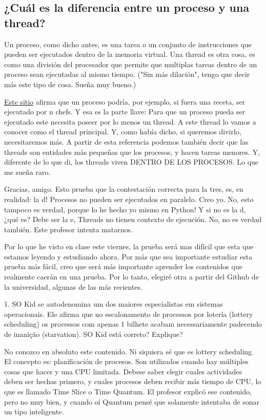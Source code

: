 \subsection{¿Cuál es la diferencia entre un proceso y una thread?}
Un proceso, como dicho antes, es una tarea o un conjunto de instrucciones que pueden ser ejecutados dentro de la memoria virtual.
Una thread es otra cosa, es como una división del procesador que permite que multiplas tareas dentro de un proceso sean ejecutadas al mismo tiempo.
("Sin más dilación", tengo que decir más este tipo de cosa. Sueña muy bueno.)

\href{https://codigofacilito.com/articulos/threads-procesos}{Este sitio} afirma que un
proceso podría, por ejemplo, si fuera una receta, ser ejecutado por n chefs. Y esa es la parte llave:
Para que un proceso pueda ser ejecutado este necesita poseer por lo menos un thread. 
A este thread lo vamos a conocer como el thread principal.
Y, como había dicho, si queremos divirlo, necesitaremos más. A partir de esta referencia podemos también decir que las threads
son entidades más pequeñas que los procesos, y hacen tareas menores. Y, diferente de lo que di, los threads
viven DENTRO DE LOS PROCESOS. Lo que me sueña raro.

Gracias, amigo. Esto prueba que la contestación correcta para la tres, es, en realidad:
la d! Procesos no pueden ser ejecutados en paralelo. Creo yo. No, esto tampoco es verdad, porque lo he hecho yo mismo en Python!
Y si no es la d, ¿qué es? Debe ser la e, Threads no tienen contexto de ejecución. No, no es verdad también.
Este profesor intenta matarnos.

Por lo que he visto en clase este viernes, la prueba será mas difícil que esta que estamos leyendo y estudiando ahora.
Por más que sea importante estudiar esta prueba más fácil, creo que será más importante aprender los contenidos que realmente caerán en una prueba.
Por lo tanto, elegiré otra a partir del Github de la universidad, algunas de las más recientes. 


1. SO Kid se autodenomina um dos maiores especialistas em sistemas operacionais. Ele afirma que no 
escalonamento de processos por lotería (lottery scheduling) os processos com apenas 1 bilhete
acabam necessariamente padecendo de inanição (starvation). SO Kid está correto? Explique?

No conozco en absoluto este contenido. Ni siquiera sé que es lottery scheduling. El concepto es: planificación de procesos.
Son utilizados cuando hay múltiples cosas que hacer y una CPU limitada. Debese saber elegir cuales actividades deben ser hechas primero, y cuales
procesos deben recibir más tiempo de CPU, lo que es llamado Time Slice o Time Quantum. El profesor explicó ese contenido, pero no muy bien, y cuando oí Quantum pensé que
solamente intentaba de sonar un tipo inteligente.

